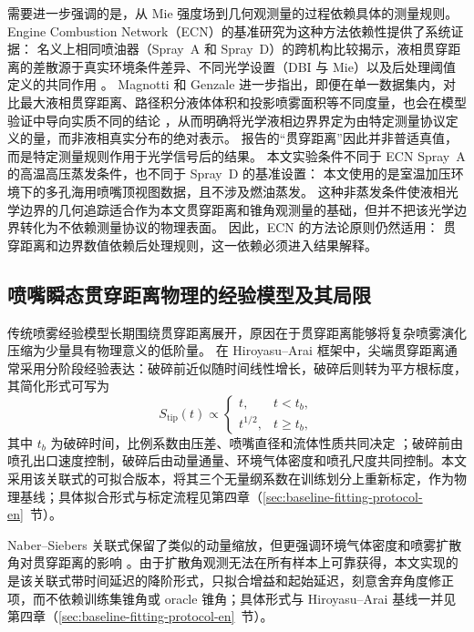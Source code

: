 需要进一步强调的是，从 Mie 强度场到几何观测量的过程依赖具体的测量规则。
Engine Combustion Network（ECN）的基准研究为这种方法依赖性提供了系统证据：
名义上相同喷油器（Spray~A 和 Spray~D）的跨机构比较揭示，液相贯穿距离的差散源于真实环境条件差异、不同光学设置（DBI 与 Mie）以及后处理阈值定义的共同作用 \cite{ecn_liquid_penetration,ecn_liquid_penetration_accessory,MeijerECN2012}。
Magnotti 和 Genzale 进一步指出，即便在单一数据集内，对比最大液相贯穿距离、路径积分液体体积和投影喷雾面积等不同度量，也会在模型验证中导向实质不同的结论 \cite{MagnottiGenzale2013}，从而明确将光学液相边界界定为由特定测量协议定义的量，而非液相真实分布的绝对表示。
报告的``贯穿距离''因此并非普适真值，而是特定测量规则作用于光学信号后的结果。
本文实验条件不同于 ECN Spray~A 的高温高压蒸发条件，也不同于 Spray~D 的基准设置：
本文使用的是室温加压环境下的多孔海用喷嘴顶视图数据，且不涉及燃油蒸发。
这种非蒸发条件使液相光学边界的几何追踪适合作为本文贯穿距离和锥角观测量的基础，但并不把该光学边界转化为不依赖测量协议的物理表面。
因此，ECN 的方法论原则仍然适用：
贯穿距离和边界数值依赖后处理规则，这一依赖必须进入结果解释。

\subsection{喷嘴瞬态贯穿距离物理的经验模型及其局限}

传统喷雾经验模型长期围绕贯穿距离展开，原因在于贯穿距离能够将复杂喷雾演化压缩为少量具有物理意义的低阶量。
在 Hiroyasu--Arai 框架中，尖端贯穿距离通常采用分阶段经验表达：破碎前近似随时间线性增长，破碎后则转为平方根标度，其简化形式可写为
\[
S_{\mathrm{tip}}(t)\propto
\begin{cases}
t, & t<t_b,\\
t^{1/2}, & t\ge t_b,
\end{cases}
\]
其中 \(t_b\) 为破碎时间，比例系数由压差、喷嘴直径和流体性质共同决定 \cite{HiroyasuArai1990}；破碎前由喷孔出口速度控制，破碎后由动量通量、环境气体密度和喷孔尺度共同控制。本文采用该关联式的可拟合版本，将其三个无量纲系数在训练划分上重新标定，作为物理基线；具体拟合形式与标定流程见第四章（\ref{sec:baseline-fitting-protocol-en}~节）。

Naber--Siebers 关联式保留了类似的动量缩放，但更强调环境气体密度和喷雾扩散角对贯穿距离的影响 \cite{NaberSiebers1996}。由于扩散角观测无法在所有样本上可靠获得，本文实现的是该关联式带时间延迟的降阶形式，只拟合增益和起始延迟，刻意舍弃角度修正项，而不依赖训练集锥角或 oracle 锥角；具体形式与 Hiroyasu--Arai 基线一并见第四章（\ref{sec:baseline-fitting-protocol-en}~节）。

